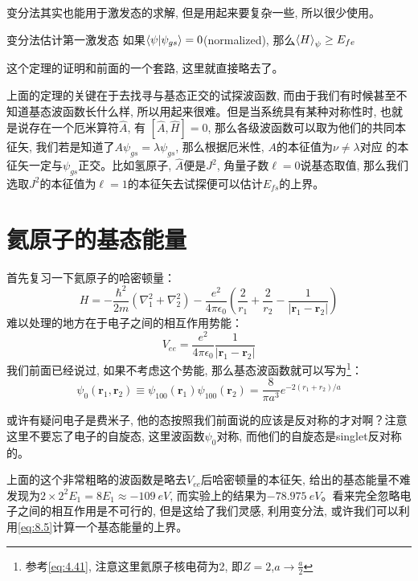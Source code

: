 \documentclass[a4paper,zihao=-4,linespread=1]{ctexrep}
\begin{document}
    变分法其实也能用于激发态的求解, 但是用起来要复杂一些, 所以很少使用。
    \begin{theorem}{变分法估计第一激发态}
        如果$\braket{\psi|\psi_{gs}}=0$(normalized), 那么$\braket{H}_\psi\geq E_{fe}$
    \end{theorem}
    
    这个定理的证明和前面的一个套路, 这里就直接略去了。
    
    上面的定理的关键在于去找寻与基态正交的试探波函数, 而由于我们有时候甚至不知道基态波函数长什么样, 所以用起来很难。但是当系统具有某种对称性时, 也就是说存在一个厄米算符$\hat{A}$, 有
    $\left[\hat{A},\hat{H}\right]=0$, 那么各级波函数可以取为他们的共同本征矢, 我们若是知道了$A\psi_{gs}=\lambda\psi_{gs}$, 那么根据厄米性, $A$的本征值为$\nu\neq\lambda$对应
    的本征矢一定与$\psi_{gs}$正交。比如氢原子, $\hat A$便是$J^2$, 角量子数$\ell=0$说基态取值, 那么我们选取$J^2$的本征值为$\ell=1$的本征矢去试探便可以估计$E_{fs}$的上界。
    
    \section{氦原子的基态能量}
    首先复习一下氦原子的哈密顿量：
    \begin{equation}
        H=-\frac{\hbar^{2}}{2 m}\left(\nabla_{1}^{2}+\nabla_{2}^{2}\right)-\frac{e^{2}}{4 \pi \epsilon_{0}}\left(\frac{2}{r_{1}}+\frac{2}{r_{2}}-\frac{1}{\left|\mathbf{r}_{1}-\mathbf{r}_{2}\right|}\right)
    \end{equation}
    难以处理的地方在于电子之间的相互作用势能：
    \begin{equation}
        V_{ee}=\frac{e^{2}}{4 \pi \epsilon_{0}} \frac{1}{\left|\mathbf{r}_{1}-\mathbf{r}_{2}\right|}
    \end{equation}
    我们前面已经说过, 如果不考虑这个势能, 那么基态波函数就可以写为\footnote{参考\ref{eq:4.41}, 注意这里氦原子核电荷为2, 即$Z=2$,$a\to\frac{a}{2}$}：
    \begin{equation}
        \label{eq:8.5}
        \psi_{0}\left(\mathbf{r}_{1}, \mathbf{r}_{2}\right) \equiv \psi_{100}\left(\mathbf{r}_{1}\right) \psi_{100}\left(\mathbf{r}_{2}\right)=\frac{8}{\pi a^{3}} e^{-2\left(r_{1}+r_{2}\right) / a}
    \end{equation}
    
    或许有疑问电子是费米子, 他的态按照我们前面说的应该是反对称的才对啊？注意这里不要忘了电子的自旋态, 这里波函数$\psi_0$对称, 而他们的自旋态是singlet反对称的。

    上面的这个非常粗略的波函数是略去$V_{ee}$后哈密顿量的本征矢, 给出的基态能量不难发现为$2\times 2^2 E_1=8E_1\approx\SI{-109}{eV}$, 而实验上的结果为$\SI{-78.975}{eV}$。看来完全忽略电子之间的相互作用是不可行的, 但是这给了我们灵感, 
    利用变分法, 或许我们可以利用\ref{eq:8.5}计算一个基态能量的上界。
\end{document}
